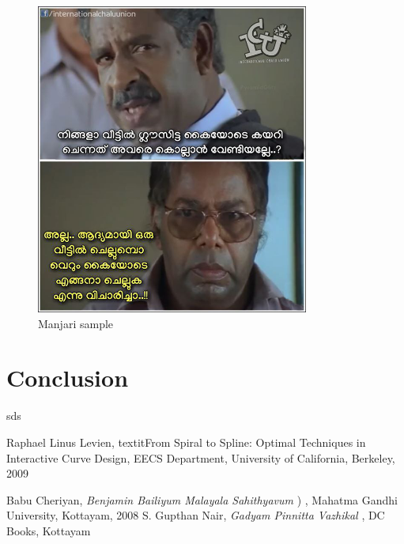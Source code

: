 \documentclass[11pt,twoside,a4paper]{article}
\begin{document}
\begin{figure}[h!]
	\includegraphics[width=0.8\textwidth]{images/manjari-sample-4.png}
	\caption{Manjari sample}
	\label{manjari-sample-4}
\end{figure}

\clearpage
\section{Conclusion}
sds

\clearpage

\begin{thebibliography}{11}

  Raphael Linus Levien,
  textit{From Spiral to Spline: Optimal Techniques in Interactive Curve Design},
  EECS Department, University of California, Berkeley,
  2009

 Babu Cheriyan, \textit{Benjamin Bailiyum Malayala Sahithyavum} {) }, Mahatma Gandhi University, Kottayam, 2008
	 S. Gupthan Nair, \textit{Gadyam Pinnitta Vazhikal}{ }, DC Books, Kottayam 

	
\end{thebibliography}
\end{document}
